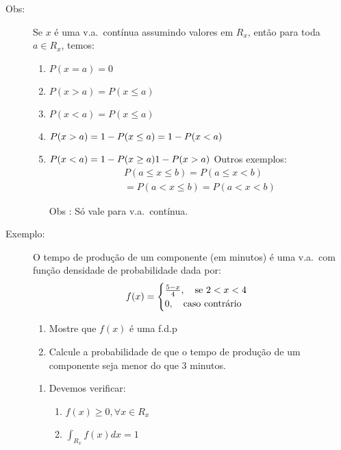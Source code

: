 \begin{description}
\begin{figure}[htpb]
       \end{figure}
     \item [Obs:] Se $x$ é uma v.a.\ contínua assumindo valores em $R_{x}$, então para toda 
       $a \in R_{x}$, temos: 
       \begin{enumerate}[label=(\alph*)]
         \item $P(x=a)=0$
         \item $P(x>a)=P(x\leq a)$
         \item $P(x<a)=P(x\le a)$
         \item $P(x>a)=1- P(x \le a)\\ = 1-P(x<a)$
         \item $P(x<a)=1-P(x \geq a)\\ 1-P(x>a)$
           Outros exemplos: 
           \begin{align}
             P(a\le x \le b)= P(a\le x < b)\\
             = P(a<x \le b)= P(a<x<b)
           \end{align}
         \item [Obs]: Só vale para v.a.\ contínua. 
       \end{enumerate}
     \item [Exemplo:] 
       O tempo de produção de um componente (em minutos) é uma v.a.\ com função densidade 
       de probabilidade dada por: 
       \begin{align}
         f(x)=
         \begin{cases}
           \frac{5-x}{4}, \text{\quad se $2<x<4$}\\
           0,\text{\quad caso contrário} 
         \end{cases}
       \end{align}
       \begin{enumerate}[label=(\alph*)]
         \item Mostre que $f(x)$ é uma f.d.p
         \item Calcule a probabilidade de que o tempo de produção de um componente 
           seja menor do que 3 minutos.
       \end{enumerate}
       \begin{enumerate}[label=(\alph*)]
         \item Devemos verificar: 
           \begin{enumerate}[leftmargin=*, label=\Roman*., widest=IV, align=left] %
             \item $f(x)\geq 0, \forall x \in R_{x}$
             \item $\int_{R_{x}} f(x)dx=1$


\end{enumerate}
\end{enumerate}
\end{description}
